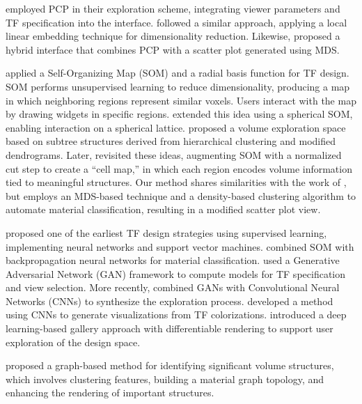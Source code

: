 \cite{tory2005} employed PCP in their exploration scheme, integrating viewer parameters and TF specification into the interface. \cite{zhao2010} followed a similar approach, applying a local linear embedding technique for dimensionality reduction. Likewise, \cite{guo2011} proposed a hybrid interface that combines PCP with a scatter plot generated using MDS.

\cite{moura2007} applied a Self-Organizing Map (SOM) and a radial basis function for TF design. SOM performs unsupervised learning to reduce dimensionality, producing a map in which neighboring regions represent similar voxels. Users interact with the map by drawing widgets in specific regions. \cite{khan2015} extended this idea using a spherical SOM, enabling interaction on a spherical lattice. \cite{wang2011} proposed a volume exploration space based on subtree structures derived from hierarchical clustering and modified dendrograms. Later, \cite{cai2017} revisited these ideas, augmenting SOM with a normalized cut step to create a “cell map,” in which each region encodes volume information tied to meaningful structures. Our method shares similarities with the work of \cite{cai2017}, but employs an MDS-based technique and a density-based clustering algorithm to automate material classification, resulting in a modified scatter plot view.

\cite{tzeng2005} proposed one of the earliest TF design strategies using supervised learning, implementing neural networks and support vector machines.\cite{wang2006} combined SOM with backpropagation neural networks for material classification. \cite{berger2018} used a Generative Adversarial Network (GAN) framework to compute models for TF specification and view selection. More recently, \cite{hong2019} combined GANs with Convolutional Neural Networks (CNNs) to synthesize the exploration process. \cite{kim2021} developed a method using CNNs to generate visualizations from TF colorizations. \cite{pan2024} introduced a deep learning-based gallery approach with differentiable rendering to support user exploration of the design space.

\cite{sharma2020} proposed a graph-based method for identifying significant volume structures, which involves clustering features, building a material graph topology, and enhancing the rendering of important structures.
